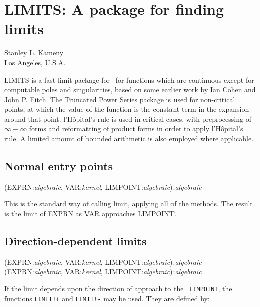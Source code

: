 \chapter{LIMITS: A package for finding limits}
\label{LIMITS}

{\footnotesize
\begin{center}
Stanley L. Kameny \\
Los Angeles, U.S.A.
\end{center}
}

LIMITS is a fast limit package for \REDUCE\ for functions which are
continuous except for computable poles and singularities, based on some
earlier work by Ian Cohen and John P. Fitch.
The Truncated Power Series
package is used for non-critical points, at which the value of the
function is the constant term in the expansion around that point.
l'H\^opital's rule is used in critical cases, with preprocessing of
$\infty - \infty$ forms and reformatting of product forms in order
to apply l'H\^opital's rule.  A limited amount of bounded arithmetic
is also employed where applicable.

\section{Normal entry points}
\vspace{.1in}
(EXPRN:{\em algebraic}, VAR:{\em kernel},
LIMPOINT:{\em algebraic}):{\em algebraic}
\vspace{.1in}

This is the standard way of calling limit, applying all of the
methods. The result is the limit of EXPRN as VAR approaches LIMPOINT.


\section{Direction-dependent limits}

\vspace{.1in}
(EXPRN:{\em algebraic}, VAR:{\em kernel},
LIMPOINT:{\em algebraic}):{\em algebraic} \\
(EXPRN:{\em algebraic}, VAR:{\em kernel},
LIMPOINT:{\em algebraic}):{\em algebraic}
\vspace{.1in}

If the limit depends upon the direction of approach to the {\tt
LIMPOINT}, the functions {\tt LIMIT!+} and {\tt LIMIT!-} may be used.
They are defined by:

